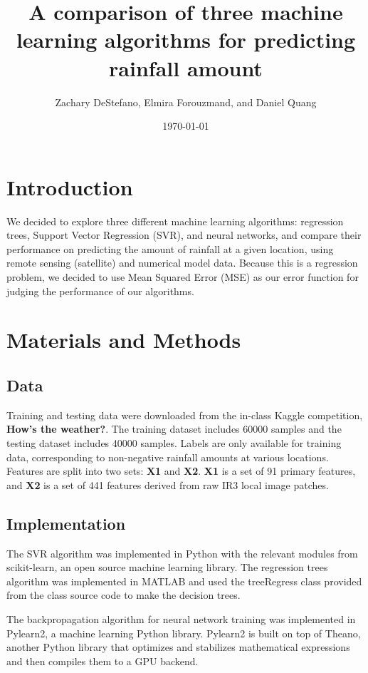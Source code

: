 \documentclass[12pt] {article}
\begin{document}
\title{A comparison of three machine learning algorithms for predicting rainfall amount}
\author{Zachary DeStefano, Elmira Forouzmand, and Daniel Quang}
\date \today
\maketitle
\thispagestyle{empty}
\bigskip
\pagebreak
\setcounter{page}{1}
\section{Introduction}
We decided to explore three different machine learning algorithms: regression trees, Support Vector Regression (SVR), and neural networks, and compare their performance on predicting the amount of rainfall at a given location, using remote sensing (satellite) and numerical model data. Because this is a regression problem, we decided to use Mean Squared Error (MSE) as our error function for judging the performance of our algorithms. 
\section{Materials and Methods}
\subsection{Data}
Training and testing data were downloaded from the in-class Kaggle competition, \textbf{How's the weather?}. The training dataset includes 60000 samples and the testing dataset includes 40000 samples. Labels are only available for training data, corresponding to non-negative rainfall amounts at various locations. Features are split into two sets: \textbf{X1} and \textbf{X2}. \textbf{X1} is a set of 91 primary features, and \textbf{X2} is a set of 441 features derived from raw IR3 local image patches.   

\subsection{Implementation}
The SVR algorithm was implemented in Python with the relevant modules from scikit-learn, an open source machine learning library. The regression trees algorithm was implemented in MATLAB and used the treeRegress class provided from the class source code to make the decision trees. 

The backpropagation algorithm for neural network training was implemented in Pylearn2, a machine learning Python library. Pylearn2 is built on top of Theano, another Python library that optimizes and stabilizes mathematical expressions and then compiles them to a GPU backend. 
\end{document}
